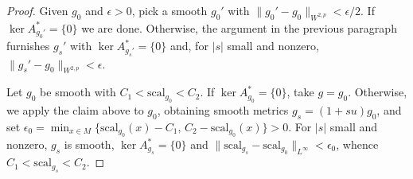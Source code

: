 \documentclass[10pt,a4paper]{amsart}
\newcommand{\ga}{\mathit{g}} %
\begin{document}
\begin{proof}
Given $\ga_0$ and $\epsilon>0$, pick a smooth $\ga_0'$ with
$\|\ga_0'-\ga_0\|_{W^{2,p}}<\epsilon/2$. If $\ker A_{\ga_0'}^*=\{0\}$ we are done.
Otherwise, the argument in the previous paragraph furnishes $\ga_s'$ with $\ker A_{\ga_s'}^*=\{0\}$ and, for
$|s|$ small and nonzero, $\|\ga_s'-\ga_0\|_{W^{2,p}}<\epsilon$.

 Let $\ga_0$ be smooth with
$C_1<\mathrm{scal}_{\ga_0}<C_2$. If $\ker A_{\ga_0}^*=\{0\}$, take $\ga=\ga_0$. Otherwise, we apply the claim above to $\ga_0$, obtaining smooth metrics $\ga_s=(1+su)\ga_0$, and set
$\epsilon_0=\min_{x\in M}\{\mathrm{scal}_{\ga_0}(x)-C_1,\,C_2-\mathrm{scal}_{\ga_0}(x)\}>0$.
For $|s|$ small and nonzero, $\ga_s$ is smooth, $\ker A_{\ga_s}^*=\{0\}$ and
$\|\mathrm{scal}_{\ga_s}-\mathrm{scal}_{\ga_0}\|_{L^\infty}<\epsilon_0$, whence
$C_1<\mathrm{scal}_{\ga_s}<C_2$. \qedhere
\end{proof}
\end{document}

